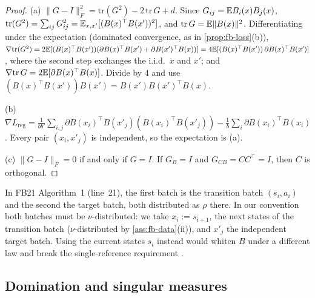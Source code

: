 \begin{proof}
(a) $\|G-I\|_F^2=\mathrm{tr}(G^2)-2\,\mathrm{tr}\,G+d$.
Since $G_{ij}=\mathbb{E} B_i(x)B_j(x)$, $\mathrm{tr}(G^2)=\sum_{ij}G_{ij}^2=\mathbb{E}_{x,x'}[(B(x)^\top B(x'))^2]$, and $\mathrm{tr}\,G=\mathbb{E}\|B(x)\|^2$.
Differentiating under the expectation (dominated convergence, as in \cref{prop:fb-loss}(b)),
$\nabla\mathrm{tr}(G^2)=2\mathbb{E}[(B(x)^\top B(x'))(\partial B(x)^\top B(x')+\partial B(x')^\top B(x))]=4\mathbb{E}[(B(x)^\top B(x'))\,\partial B(x)^\top B(x')]$, where the second step exchanges the i.i.d.\ $x$ and $x'$; and $\nabla\mathrm{tr}\,G=2\mathbb{E}[\partial B(x)^\top B(x)]$.
Divide by $4$ and use $(B(x)^\top B(x'))B(x')=B(x')B(x')^\top B(x)$.

(b) $\nabla L_{\mathrm{reg}}=\frac1{bb'}\sum_{i,j}\partial B(x_i)^\top B(x'_j)(B(x_i)^\top B(x'_j))-\frac1b\sum_i\partial B(x_i)^\top B(x_i)$. Every pair $(x_i,x'_j)$ is independent, so the expectation is (a).

(c) $\|G-I\|_F=0$ if and only if $G=I$. If $G_B=I$ and $G_{CB}=CC^\top=I$, then $C$ is orthogonal.
\end{proof}
In FB21 Algorithm~1 (line~21), the first batch is the transition batch $(s_i,a_i)$ and the second the target batch, both distributed as $\rho$ there.
In our convention both batches must be $\nu$-distributed: we take $x_i:=s_{i+1}$, the next states of the transition batch ($\nu$-distributed by \cref{ass:fb-data}(ii)), and $x'_j$ the independent target batch.
Using the current states $s_i$ instead would whiten $B$ under a different law and break the single-reference requirement .

\subsection{Domination and singular measures}\label{sec:fb-dom}

